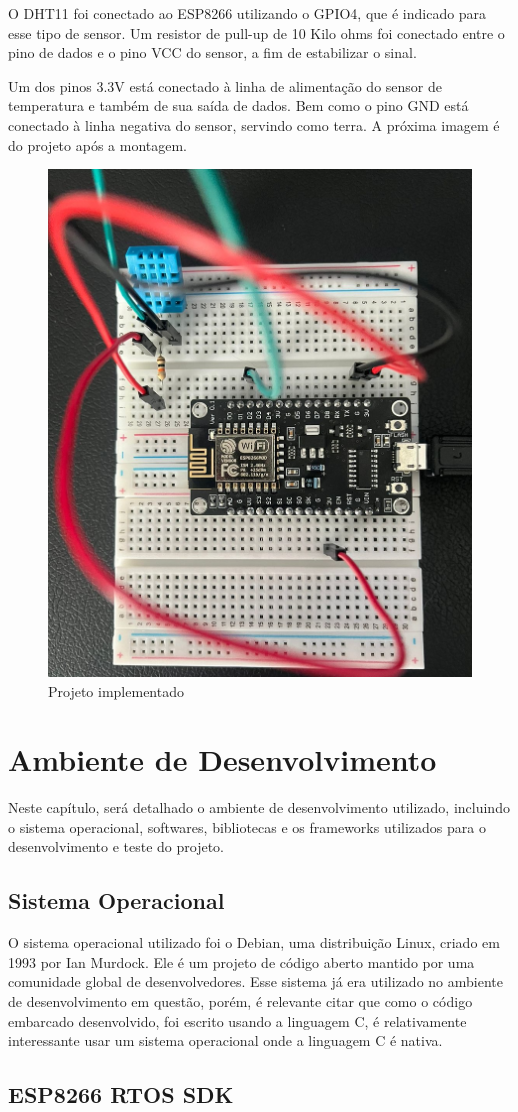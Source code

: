 \documentclass[12pt]{article}
\begin{document}
O DHT11 foi conectado ao ESP8266 utilizando o GPIO4, que é indicado para esse tipo de sensor. Um resistor de pull-up de 10 Kilo ohms foi conectado entre o pino de dados e o pino VCC do sensor, a fim de estabilizar o sinal. 

Um dos pinos 3.3V está conectado à linha de alimentação do sensor de temperatura e também de sua saída de dados. Bem como o pino GND está conectado à linha negativa do sensor, servindo como terra. A próxima imagem é do projeto após a montagem.

\begin{figure}[ht]
  \centering
  \includegraphics[width=.3\textwidth]{assets/img/project.png}
  \caption{Projeto implementado}
\end{figure}

\section{Ambiente de Desenvolvimento}

Neste capítulo, será detalhado o ambiente de desenvolvimento utilizado, incluindo o sistema operacional, softwares, bibliotecas e os frameworks utilizados para o desenvolvimento e teste do projeto.

\subsection{Sistema Operacional}

O sistema operacional utilizado foi o Debian, uma distribuição Linux, criado em 1993 por Ian Murdock. Ele é um projeto de código aberto mantido por uma comunidade global de desenvolvedores. Esse sistema já era utilizado no ambiente de desenvolvimento em questão, porém, é relevante citar que como o código embarcado desenvolvido, foi escrito usando a linguagem C, é relativamente interessante usar um sistema operacional onde a linguagem C é nativa.

\subsection{ESP8266 RTOS SDK}
\end{document}
